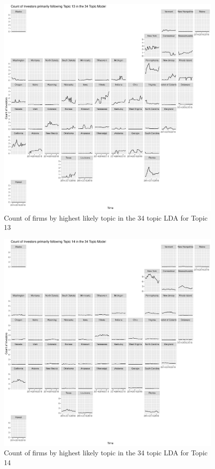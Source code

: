 		\begin{figure}
		\centering
		\includegraphics[width=1\linewidth]{Figures/ChapterV/USA_34_Topic13.pdf}
		\caption[Count of Firms for Topic 13 by Quarter]{Count of firms by highest likely topic in the 34 topic LDA for Topic 13}
		\label{fig:StateLDA13}
	\end{figure}
	
		\begin{figure}
		\centering
		\includegraphics[width=1\linewidth]{Figures/ChapterV/USA_34_Topic14.pdf}
		\caption[Count of Firms for Topic 14 by Quarter]{Count of firms by highest likely topic in the 34 topic LDA for Topic 14}
		\label{fig:StateLDA14}
	\end{figure}
	
